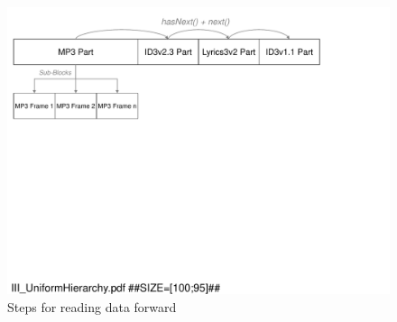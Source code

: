 \begin{figure}[htbp]
  \centering
  \includegraphics[width=1.0\linewidth]{figures/III_ForwardReading.pdf}
  \caption{Steps for reading data forward}
  \label{fig:III_ForwardReading}
\end{figure}

